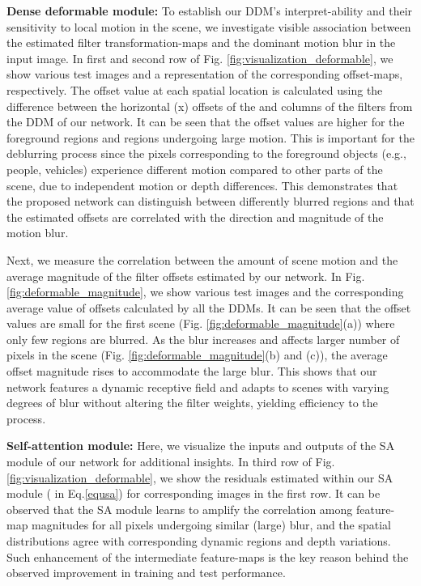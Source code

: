 \documentclass[letterpaper]{article} \usepackage{aaai20}  \usepackage{times}  \usepackage{helvet} \usepackage{courier}  \usepackage[hyphens]{url}  \usepackage{graphicx} \urlstyle{rm} \def\UrlFont{\rm}  \usepackage{graphicx}  \frenchspacing  \setlength{\pdfpagewidth}{8.5in}  \setlength{\pdfpageheight}{11in}
\begin{document}
\noindent \textbf{Dense deformable module:} To establish our DDM's interpret-ability and their sensitivity to local motion in the scene, we investigate visible association between the estimated filter transformation-maps and the dominant motion blur in the input image. In first and second row of Fig. \ref{fig:visualization_deformable}, we show various test images and a representation of the corresponding offset-maps, respectively. The offset value at each spatial location is calculated using the difference between the horizontal (\mbox{x}) offsets of the  and  columns of the  filters from the  DDM of our network. It can be seen that the offset values are higher for the foreground regions and regions undergoing large motion. This is important for the deblurring process since the pixels corresponding to the foreground objects (e.g., people, vehicles) experience different motion compared to other parts of the scene, due to independent motion or depth differences. This demonstrates that the proposed network can distinguish between differently blurred regions and that the estimated offsets are correlated with the direction and magnitude of the motion blur.

Next, we measure the correlation between the amount of scene motion and the average magnitude of the filter offsets estimated by our network. In Fig. \ref{fig:deformable_magnitude}, we show various test images and the corresponding average value of offsets calculated by all the DDMs. It can be seen that the offset values are small for the first scene (Fig. \ref{fig:deformable_magnitude}(a)) where only few regions are blurred. As the blur increases and affects larger number of pixels in the scene (Fig. \ref{fig:deformable_magnitude}(b) and (c)), the average offset magnitude rises to accommodate the large blur. This shows that our network features a dynamic receptive field and adapts to scenes with varying degrees of blur without altering the filter weights, yielding efficiency to the process.



\noindent \textbf{Self-attention module:}
Here, we visualize the inputs and outputs of the SA module of our network for additional insights. In third row of Fig. \ref{fig:visualization_deformable}, we show the residuals estimated within our SA module ( in Eq.\ref{equsa}) for corresponding images in the first row. It can be observed that the SA module learns to amplify the correlation among feature-map magnitudes for all pixels undergoing similar (large) blur, and the spatial distributions agree with corresponding dynamic regions and depth variations. Such enhancement of the intermediate feature-maps is the key reason behind the observed improvement in training and test performance.
\end{document}
